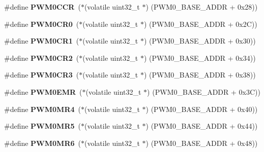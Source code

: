 \begin{DoxyCompactItemize}
\#define {\bfseries P\+W\+M0\+C\+CR}~($\ast$(volatile uint32\+\_\+t $\ast$) (P\+W\+M0\+\_\+\+B\+A\+S\+E\+\_\+\+A\+D\+DR + 0x28))
\item 
\mbox{\label{group__lpc24xx__regs_ga15f8541c5bbede9ff26a132ade4d4c72}} 
\#define {\bfseries P\+W\+M0\+C\+R0}~($\ast$(volatile uint32\+\_\+t $\ast$) (P\+W\+M0\+\_\+\+B\+A\+S\+E\+\_\+\+A\+D\+DR + 0x2\+C))
\item 
\mbox{\label{group__lpc24xx__regs_ga5cf008cbe5d4ca620968c0bdfb7ab9fd}} 
\#define {\bfseries P\+W\+M0\+C\+R1}~($\ast$(volatile uint32\+\_\+t $\ast$) (P\+W\+M0\+\_\+\+B\+A\+S\+E\+\_\+\+A\+D\+DR + 0x30))
\item 
\mbox{\label{group__lpc24xx__regs_gaf091cfaa51bf890b312608df5d49287a}} 
\#define {\bfseries P\+W\+M0\+C\+R2}~($\ast$(volatile uint32\+\_\+t $\ast$) (P\+W\+M0\+\_\+\+B\+A\+S\+E\+\_\+\+A\+D\+DR + 0x34))
\item 
\mbox{\label{group__lpc24xx__regs_gae1aeb66783d50978640b4b590bbed597}} 
\#define {\bfseries P\+W\+M0\+C\+R3}~($\ast$(volatile uint32\+\_\+t $\ast$) (P\+W\+M0\+\_\+\+B\+A\+S\+E\+\_\+\+A\+D\+DR + 0x38))
\item 
\mbox{\label{group__lpc24xx__regs_gad8cd406737c9e84fb2483fa400634c86}} 
\#define {\bfseries P\+W\+M0\+E\+MR}~($\ast$(volatile uint32\+\_\+t $\ast$) (P\+W\+M0\+\_\+\+B\+A\+S\+E\+\_\+\+A\+D\+DR + 0x3\+C))
\item 
\mbox{\label{group__lpc24xx__regs_gabbcf506211ab6ab1b2c5c1f38780ea1c}} 
\#define {\bfseries P\+W\+M0\+M\+R4}~($\ast$(volatile uint32\+\_\+t $\ast$) (P\+W\+M0\+\_\+\+B\+A\+S\+E\+\_\+\+A\+D\+DR + 0x40))
\item 
\mbox{\label{group__lpc24xx__regs_gac2f16ed00cfd73ecea8bd57266fa12bf}} 
\#define {\bfseries P\+W\+M0\+M\+R5}~($\ast$(volatile uint32\+\_\+t $\ast$) (P\+W\+M0\+\_\+\+B\+A\+S\+E\+\_\+\+A\+D\+DR + 0x44))
\item 
\mbox{\label{group__lpc24xx__regs_gabbdda6279c621cc44c2fe204b37b17ce}} 
\#define {\bfseries P\+W\+M0\+M\+R6}~($\ast$(volatile uint32\+\_\+t $\ast$) (P\+W\+M0\+\_\+\+B\+A\+S\+E\+\_\+\+A\+D\+DR + 0x48))

\end{DoxyCompactItemize}

